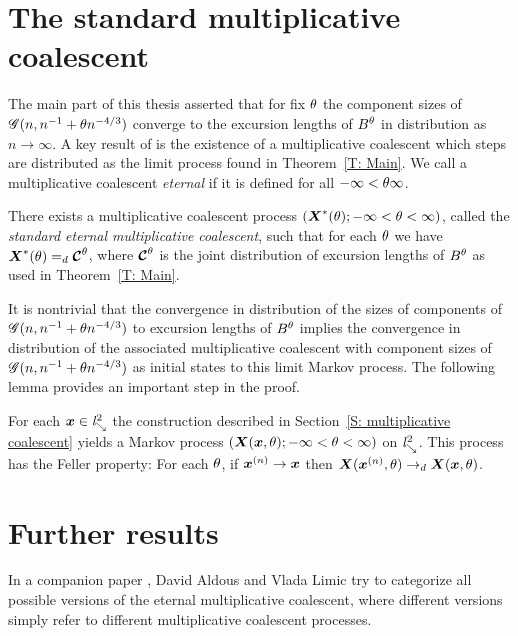 \section{The standard multiplicative coalescent}

The main part of this thesis asserted that for fix $\theta$ the component sizes of $\mathscr{G}(n, n^{-1} + \theta n^{-4/3})$ converge to the excursion lengths of $B^{\theta}$
in distribution as $n \rightarrow \infty$.
A key result of \cite{Aldous.1997} is the existence of a multiplicative coalescent which steps are distributed as the limit process found in Theorem~\ref{T: Main}.
We call a multiplicative coalescent \emph{eternal} if it is defined for all $-\infty < \theta \infty$.

\begin{theorem}
	There exists a multiplicative coalescent process
	$ (\boldsymbol{X}^*(\theta); -\infty < \theta < \infty) $,
	called the \emph{standard eternal multiplicative coalescent},
	such that for each $\theta$ we have $\boldsymbol{X}^*(\theta) =_d \boldsymbol{\mathcal{C}}^{\theta}$,
	where $\boldsymbol{\mathcal{C}}^{\theta}$ is the joint distribution of excursion lengths of $B^{\theta}$ as used in Theorem~\ref{T: Main}.
\end{theorem}

It is nontrivial that the convergence in distribution of the sizes of components of $\mathscr{G}(n, n^{-1} + \theta n^{-4/3})$ to
excursion lengths of $B^{\theta}$ implies the convergence in distribution of the associated multiplicative coalescent 
with component sizes of $\mathscr{G}(n, n^{-1} + \theta n^{-4/3})$ as initial states to this limit Markov process.
The following lemma provides an important step in the proof.

\begin{lemma}
	For each $\boldsymbol{x} \in \mathit{l}^2_{\searrow}$ the construction described in Section~\ref{S: multiplicative coalescent} yields a Markov process
	$(\boldsymbol{X}(\boldsymbol{x}, \theta); -\infty < \theta < \infty)$ on $\mathit{l}^2_{\searrow}$. This process has the Feller property:
	For each $\theta$, if $\boldsymbol{x}^{(n)} \rightarrow \boldsymbol{x}$ then $\boldsymbol{X}(\boldsymbol{x}^{(n)}, \theta) \rightarrow_d \boldsymbol{X}(\boldsymbol{x}, \theta)$.
\end{lemma}

\section{Further results}

In a companion paper \cite{Aldous.1998}, 
David Aldous and Vlada Limic try to categorize all possible versions of the eternal multiplicative coalescent,
where different versions simply refer to different multiplicative coalescent processes.





